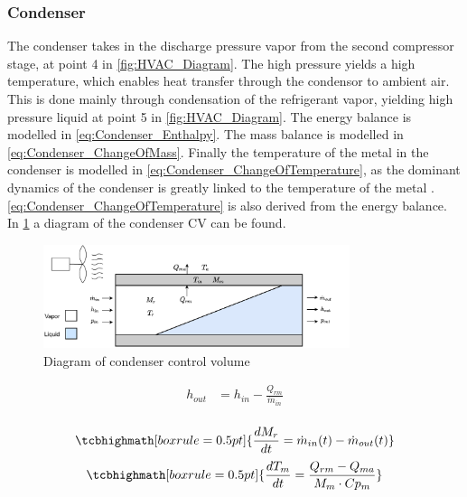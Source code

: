 \subsubsection{Condenser}

The condenser takes in the discharge pressure vapor from the second compressor stage, at point 4 in \cref{fig:HVAC_Diagram}. The high pressure yields a high temperature,
which enables heat transfer through the condensor to ambient air. This is done mainly through condensation of the refrigerant vapor, yielding high pressure liquid at point 5 in \cref{fig:HVAC_Diagram}.
The energy balance is modelled in \cref{eq:Condenser_Enthalpy}. The mass balance is modelled in \cref{eq:Condenser_ChangeOfMass}. Finally the temperature of the metal in the condenser is modelled in
\cref{eq:Condenser_ChangeOfTemperature}, as the dominant dynamics of the condenser is greatly linked to the temperature of the metal \cite{Sorensen2013}. \cref{eq:Condenser_ChangeOfTemperature} is also
derived from the energy balance. In \cref{fig:condenser_CV} a diagram of the condenser CV can be found.

\begin{figure}[h!]
	\centering
	\includegraphics[width=0.8\textwidth]{Graphics/Condenser.pdf}
	\caption{Diagram of condenser control volume}
	\label{fig:condenser_CV}
\end{figure}

\begin{align}
	h_{out} 			& = h_{in} - \frac{Q_{rm}}{\dot{m}_{in}}  	\label{eq:Condenser_Enthalpy} \\
\end{align}

\begin{equation}
	\tcbhighmath[boxrule = 0.5pt]{ 	\frac{dM_r}{dt} 	 = \dot{m}_{in}(t) - \dot{m}_{out}(t) }     	\label{eq:Condenser_ChangeOfMass}   
\end{equation}
\begin{equation}
	\tcbhighmath[boxrule = 0.5pt]{ 	\frac{dT_m}{dt} 	 = \frac{Q_{rm} - Q_{ma}}{M_m \cdot Cp_m}	 }     \label{eq:Condenser_ChangeOfTemperature}      
\end{equation}



